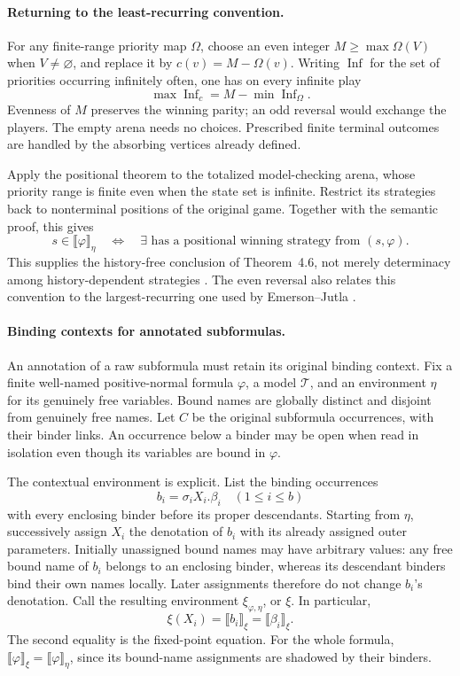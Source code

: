 \paragraph{Returning to the least-recurring convention.}
For any finite-range priority map \(\Omega\),
choose an even integer \(M\geq\max\Omega(V)\)
when \(V\ne\varnothing\), and replace it by
\(c(v)=M-\Omega(v)\). Writing \(\operatorname{Inf}\)
for the set of priorities occurring infinitely often,
one has on every infinite play
\[
 \max\operatorname{Inf}_c
      =M-\min\operatorname{Inf}_\Omega.
\]
Evenness of \(M\) preserves the
winning parity; an odd reversal would
exchange the players.
The empty arena needs no choices.
Prescribed finite terminal outcomes
are handled by the absorbing vertices
already defined.

Apply the positional theorem to the
totalized model-checking arena, whose
priority range is finite even when
the state set is infinite. Restrict
its strategies back to nonterminal
positions of the original game.
Together with the semantic proof,
this gives
\[
 s\in\llbracket\varphi\rrbracket_\eta
 \quad\Longleftrightarrow\quad
 \exists\text{ has a positional winning strategy
 from }(s,\varphi).
\]
This supplies the history-free conclusion
of Theorem~4.6, not merely determinacy
among history-dependent strategies
\cite[\S4.4, thm.~4.6]{BradfieldStirling2007}.
The even reversal also relates this
convention to the largest-recurring
one used by Emerson--Jutla
\cite[\S4.2]{EmersonJutla1991}.

\paragraph{Binding contexts for annotated subformulas.}
\label{sec:p09-mu-contextual-truth}
An annotation of a raw subformula must
retain its original binding context.
Fix a finite well-named positive-normal
formula \(\varphi\), a model \(\mathcal T\),
and an environment \(\eta\) for its
genuinely free variables.
Bound names are globally distinct
and disjoint from genuinely free names.
Let \(C\) be the original subformula
occurrences, with their binder links.
An occurrence below a binder may be
open when read in isolation even
though its variables are bound
in \(\varphi\).

The contextual environment is explicit.
List the binding occurrences
\[
 b_i=\sigma_iX_i.\beta_i\quad(1\leq i\leq b)
\]
with every enclosing binder before
its proper descendants.
Starting from \(\eta\), successively
assign \(X_i\) the denotation of
\(b_i\) with its already assigned
outer parameters.
Initially unassigned bound names
may have arbitrary values: any
free bound name of \(b_i\)
belongs to an enclosing binder,
whereas its descendant binders
bind their own names locally.
Later assignments therefore do
not change \(b_i\)'s denotation.
Call the resulting environment
\(\xi_{\varphi,\eta}\), or \(\xi\).
In particular,
\[
 \xi(X_i)=\llbracket b_i\rrbracket_\xi
         =\llbracket\beta_i\rrbracket_\xi.
\]
The second equality is the
fixed-point equation.
For the whole formula,
\(\llbracket\varphi\rrbracket_\xi
 =\llbracket\varphi\rrbracket_\eta\),
since its bound-name assignments
are shadowed by their binders.


